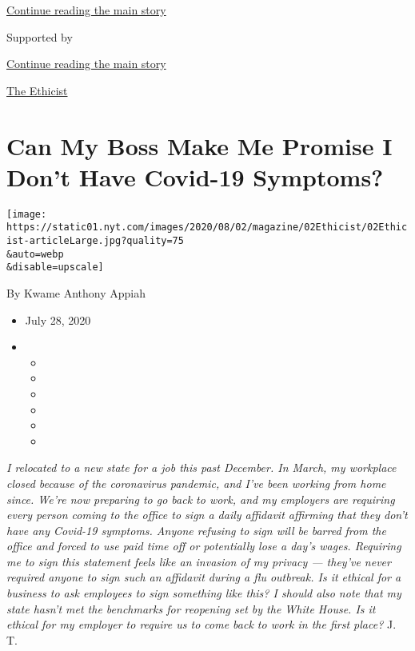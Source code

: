 \protect\hyperlink{after-top}{Continue reading the main story}

Supported by

\protect\hyperlink{after-sponsor}{Continue reading the main story}

\href{/column/the-ethicist}{The Ethicist}

\hypertarget{can-my-boss-make-me-promise-i-dont-have-covid-19-symptoms}{%
\section{Can My Boss Make Me Promise I Don't Have Covid-19
Symptoms?}\label{can-my-boss-make-me-promise-i-dont-have-covid-19-symptoms}}

\texttt{[image: https://static01.nyt.com/images/2020/08/02/magazine/02Ethicist/02Ethicist-articleLarge.jpg?quality=75\\\&auto=webp\\\&disable=upscale]}

By Kwame Anthony Appiah

\begin{itemize}
\item
  July 28, 2020
\item
  \begin{itemize}
  \item
  \item
  \item
  \item
  \item
  \item
  \end{itemize}
\end{itemize}

\emph{I relocated to a new state for a job this past December. In March,
my workplace closed because of the coronavirus pandemic, and I've been
working from home since. We're now preparing to go back to work, and my
employers are requiring every person coming to the office to sign a
daily affidavit affirming that they don't have any Covid-19 symptoms.
Anyone refusing to sign will be barred from the office and forced to use
paid time off or potentially lose a day's wages. Requiring me to sign
this statement feels like an invasion of my privacy --- they've never
required anyone to sign such an affidavit during a flu outbreak. Is it
ethical for a business to ask employees to sign something like this? I
should also note that my state hasn't met the benchmarks for reopening
set by the White House. Is it ethical for my employer to require us to
come back to work in the first place?} J. T.

